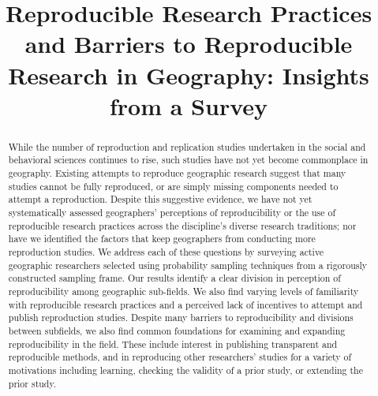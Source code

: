 \documentclass[]{interact}
\theoremstyle{plain}%
\theoremstyle{definition}
\theoremstyle{remark}
\begin{document}

\title{Reproducible Research Practices and Barriers to Reproducible Research in Geography: Insights from a Survey}

\author{
}

\maketitle

\begin{abstract}
While the number of reproduction and replication studies undertaken in the social and behavioral sciences continues to rise, such studies have not yet become commonplace in geography. 
Existing attempts to reproduce geographic research suggest that many studies cannot be fully reproduced, or are simply missing components needed to attempt a reproduction. 
Despite this suggestive evidence, we have not yet systematically assessed geographers' perceptions of reproducibility or the use of reproducible research practices across the discipline's diverse research traditions; nor have we identified the factors that keep geographers from conducting more reproduction studies.
We address each of these questions by surveying active geographic researchers selected using probability sampling techniques from a rigorously constructed sampling frame.
Our results identify a clear division in perception of reproducibility among geographic sub-fields. 
We also find varying levels of familiarity with reproducible research practices and a perceived lack of incentives to attempt and publish reproduction studies. 
Despite many barriers to reproducibility and divisions between subfields, we also find common foundations for examining and expanding reproducibility in the field.
These include interest in publishing transparent and reproducible methods, and in reproducing other researchers' studies for a variety of motivations including learning, checking the validity of a prior study, or extending the prior study.


\end{abstract}
\end{document}
